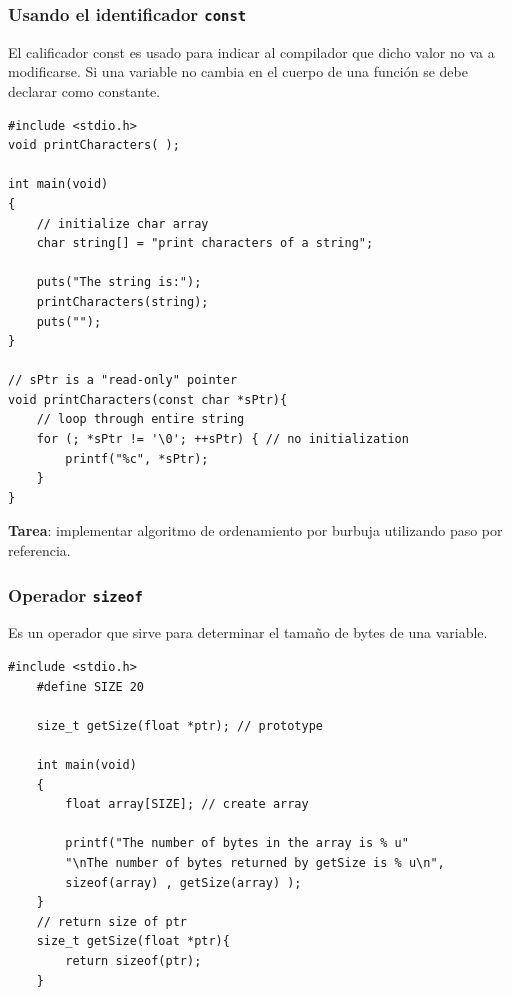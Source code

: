 \documentclass[10.5pt,scale=1.0,t,aspectratio=169,hyperref={pdfpagelabels=false}]{beamer}
\begin{document}
\begin{frame}[fragile]
	\frametitle{Usando el identificador \texttt{const}}
	El calificador const es usado para indicar al compilador que dicho valor no va a modificarse. Si una variable no cambia en el cuerpo de una función se debe declarar como constante.
	\begin{multicols}{2}  
		\begin{lstlisting}[style=CStyle]
#include <stdio.h>
void printCharacters( );

int main(void)
{
	// initialize char array
	char string[] = "print characters of a string";
	
	puts("The string is:");
	printCharacters(string);
	puts("");
}

// sPtr is a "read-only" pointer
void printCharacters(const char *sPtr){
	// loop through entire string
	for (; *sPtr != '\0'; ++sPtr) { // no initialization
		printf("%c", *sPtr);
	}
}
		\end{lstlisting}
	\end{multicols}

\textbf{Tarea}: implementar algoritmo de ordenamiento por burbuja utilizando paso por referencia. 
\end{frame}
\begin{frame}[fragile]
	\frametitle{Operador \texttt{sizeof}}
	Es un operador que sirve para determinar el tamaño de bytes de una variable. 
	\begin{lstlisting}[style=CStyle]
	#include <stdio.h>
	#define SIZE 20
	
	size_t getSize(float *ptr); // prototype
	
	int main(void)
	{
		float array[SIZE]; // create array
		
		printf("The number of bytes in the array is % u"
		"\nThe number of bytes returned by getSize is % u\n",
		sizeof(array) , getSize(array) );
	}
	// return size of ptr
	size_t getSize(float *ptr){
		return sizeof(ptr);
	}
	\end{lstlisting}
\end{frame}
\end{document}
